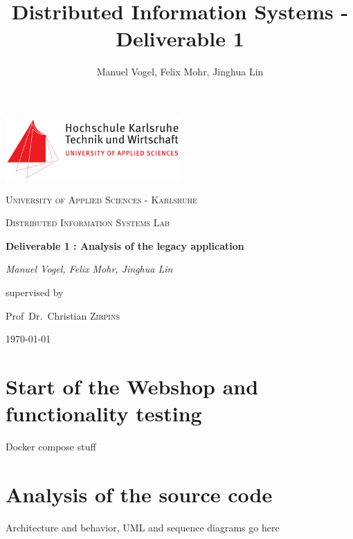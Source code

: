 \documentclass[11pt]{article}
\title{Distributed Information Systems - Deliverable 1}
\author{Manuel Vogel, Felix Mohr,  Jinghua Lin}
\begin{document}
	\begin{titlepage}
		\centering
		\includegraphics[width=0.5\textwidth]{hska-logo}\par\vspace{1cm}
		{\scshape\LARGE University of Applied Sciences - Karlsruhe \par}
		\vspace{1cm}
		{\scshape\Large Distributed Information Systems Lab\par}
		\vspace{1.5cm}
		{\huge\bfseries Deliverable 1 : Analysis of the legacy application\par}
		\vspace{2cm}
		{\Large\itshape Manuel Vogel, Felix Mohr,  Jinghua Lin\par}
		\vfill
		supervised by\par
		Prof~Dr.~Christian \textsc{Zirpins}
		\vfill
		{\large \today\par}
	\end{titlepage}
	
	\section{Start of the Webshop and functionality testing}
	Docker compose stuff
	
	\section{Analysis of the source code}
    Architecture and behavior, UML and sequence diagrams go here
	
\end{document}
